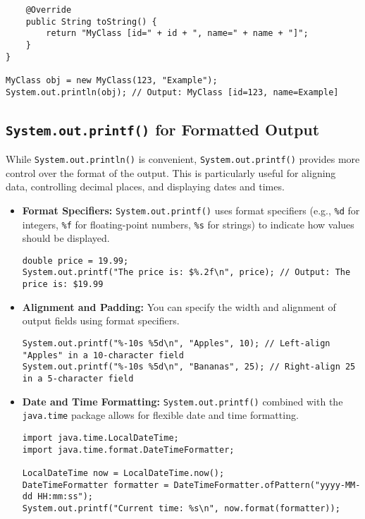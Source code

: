 \documentclass{article}
\begin{document}
{{{{\begin{itemize}
\begin{verbatim}
    @Override
    public String toString() {
        return "MyClass [id=" + id + ", name=" + name + "]";
    }
}

MyClass obj = new MyClass(123, "Example");
System.out.println(obj); // Output: MyClass [id=123, name=Example]
\end{verbatim}
\end{itemize}

\subsection*{\texttt{System.out.printf()} for Formatted Output}

While \texttt{System.out.println()} is convenient, \texttt{System.out.printf()} provides more control over the format of the output. This is particularly useful for aligning data, controlling decimal places, and displaying dates and times.

\begin{itemize}
\item \textbf{Format Specifiers:} \texttt{System.out.printf()} uses format specifiers (e.g., \texttt{\%d} for integers, \texttt{\%f} for floating-point numbers, \texttt{\%s} for strings) to indicate how values should be displayed.

\begin{verbatim}
double price = 19.99;
System.out.printf("The price is: $%.2f\n", price); // Output: The price is: $19.99
\end{verbatim}

\item \textbf{Alignment and Padding:} You can specify the width and alignment of output fields using format specifiers.
\begin{verbatim}
System.out.printf("%-10s %5d\n", "Apples", 10); // Left-align "Apples" in a 10-character field
System.out.printf("%-10s %5d\n", "Bananas", 25); // Right-align 25 in a 5-character field
\end{verbatim}

\item \textbf{Date and Time Formatting:}  \texttt{System.out.printf()} combined with the \texttt{java.time} package allows for flexible date and time formatting.
\begin{verbatim}
import java.time.LocalDateTime;
import java.time.format.DateTimeFormatter;

LocalDateTime now = LocalDateTime.now();
DateTimeFormatter formatter = DateTimeFormatter.ofPattern("yyyy-MM-dd HH:mm:ss");
System.out.printf("Current time: %s\n", now.format(formatter));
\end{verbatim}
\end{itemize}

}}}}
\end{document}
